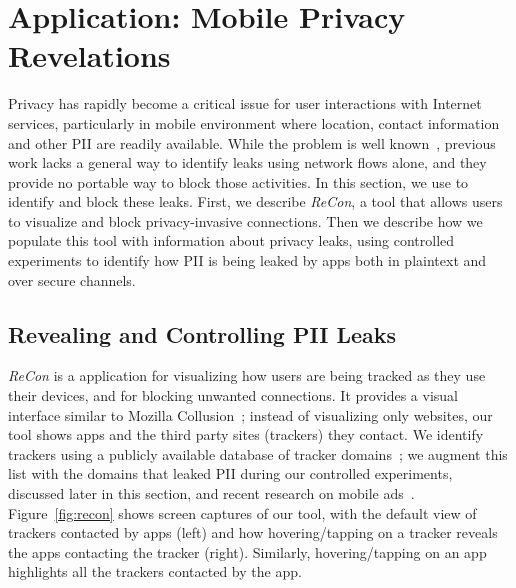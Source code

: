 \section{Application: Mobile Privacy\\ Revelations}
\label{sec:characterize-app}


Privacy has rapidly become a critical issue for user interactions with Internet services, particularly in mobile environment where location, contact information and other PII are readily available. 
While the problem is well known~\cite{roesner:webtrackers,leontiadis:mobileads,vallina-rod:ads}, previous work lacks a general way to identify leaks using network flows alone, and they provide no portable way to block those activities. 
In this section, we use \meddle to identify and block these leaks. 
First, we describe \emph{ReCon}, a tool that allows users to visualize and block privacy-invasive connections. 
Then we describe how we populate this tool with information about privacy leaks, using controlled experiments to identify how PII is being leaked by apps both in plaintext and over secure channels. 

\subsection{Revealing and Controlling PII Leaks}
\label{subsec:recon}

\emph{ReCon} is a \meddle application for visualizing how users are being tracked as they use their devices, and for blocking unwanted connections.
It provides a visual interface similar to Mozilla Collusion~\cite{collusion}; instead of visualizing only websites, our tool shows apps and the third party sites (trackers) they contact. 
We identify trackers using a publicly available database of tracker domains~\cite{yoyoads}; we augment this list with the domains that leaked PII during our controlled experiments, discussed later in this section, and recent research on mobile ads~\cite{hornyack:appfence, leontiadis:mobileads}.
Figure~\ref{fig:recon} shows screen captures of our tool, with the default view of trackers contacted by apps (left) and how hovering/tapping on a tracker reveals the apps contacting the tracker (right). 
Similarly, hovering/tapping on an app highlights all the trackers contacted by the app.

